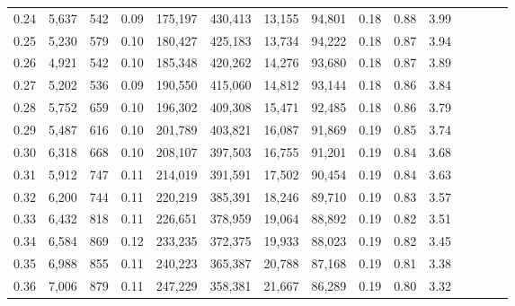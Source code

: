 \begin{tabular}{rrrcrrrrrrrrrrr}
0.24 &   5,637 &     542 &                                       0.09 &  175,197 &  430,413 &   13,155 &   94,801 &  0.18 &  0.88 &                         3.99 \\
0.25 &   5,230 &     579 &                                       0.10 &  180,427 &  425,183 &   13,734 &   94,222 &  0.18 &  0.87 &                         3.94 \\
0.26 &   4,921 &     542 &                                       0.10 &  185,348 &  420,262 &   14,276 &   93,680 &  0.18 &  0.87 &                         3.89 \\
0.27 &   5,202 &     536 &                                       0.09 &  190,550 &  415,060 &   14,812 &   93,144 &  0.18 &  0.86 &                         3.84 \\
0.28 &   5,752 &     659 &                                       0.10 &  196,302 &  409,308 &   15,471 &   92,485 &  0.18 &  0.86 &                         3.79 \\
0.29 &   5,487 &     616 &                                       0.10 &  201,789 &  403,821 &   16,087 &   91,869 &  0.19 &  0.85 &                         3.74 \\
0.30 &   6,318 &     668 &                                       0.10 &  208,107 &  397,503 &   16,755 &   91,201 &  0.19 &  0.84 &                         3.68 \\
0.31 &   5,912 &     747 &                                       0.11 &  214,019 &  391,591 &   17,502 &   90,454 &  0.19 &  0.84 &                         3.63 \\
0.32 &   6,200 &     744 &                                       0.11 &  220,219 &  385,391 &   18,246 &   89,710 &  0.19 &  0.83 &                         3.57 \\
0.33 &   6,432 &     818 &                                       0.11 &  226,651 &  378,959 &   19,064 &   88,892 &  0.19 &  0.82 &                         3.51 \\
0.34 &   6,584 &     869 &                                       0.12 &  233,235 &  372,375 &   19,933 &   88,023 &  0.19 &  0.82 &                         3.45 \\
0.35 &   6,988 &     855 &                                       0.11 &  240,223 &  365,387 &   20,788 &   87,168 &  0.19 &  0.81 &                         3.38 \\
0.36 &   7,006 &     879 &                                       0.11 &  247,229 &  358,381 &   21,667 &   86,289 &  0.19 &  0.80 &                         3.32 \\

\end{tabular}
